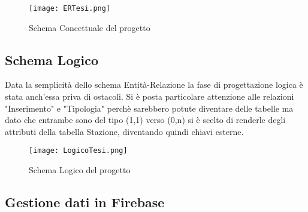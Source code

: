\begin{figure}[ht!]
    \centering
    {\texttt{[image: ERTesi.png]}\label{schemaEr}}
    \caption{Schema Concettuale del progetto}
\end{figure} 

\subsection{Schema Logico}
Data la semplicità dello schema Entità-Relazione la fase di progettazione logica
è stata anch'essa priva di ostacoli. Si è posta particolare attenzione alle
relazioni "Inserimento" e "Tipologia" perchè sarebbero potute diventare delle
tabelle ma dato che entrambe sono del tipo (1,1) verso (0,n) si è scelto di
renderle degli attributi della tabella Stazione, diventando quindi chiavi esterne. 

\begin{figure}[ht!]
    \centering
    {\texttt{[image: LogicoTesi.png]}\label{schemaLogico}}
    \caption{Schema Logico del progetto}
\end{figure} 

\subsection{Gestione dati in Firebase}